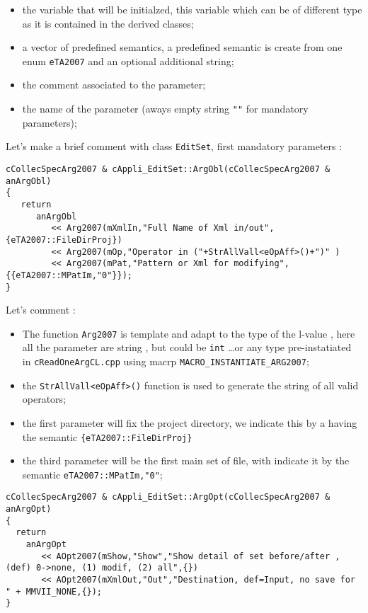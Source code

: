 \begin{itemize}
   \item  the variable that will be initialzed, this variable which can be of different type
          as it is contained in the derived classes;

   \item  a vector of predefined semantics, a predefined semantic is create from one
          enum {\tt eTA2007} and an optional additional string;
   \item  the comment associated to the parameter;
   \item  the name of the parameter (aways empty string {\tt ""} for mandatory parameters);
\end{itemize}

Let's make a brief comment with class {\tt EditSet}, first mandatory parameters :

{\small
\begin{verbatim}
cCollecSpecArg2007 & cAppli_EditSet::ArgObl(cCollecSpecArg2007 & anArgObl)
{
   return
      anArgObl
         << Arg2007(mXmlIn,"Full Name of Xml in/out",{eTA2007::FileDirProj})
         << Arg2007(mOp,"Operator in ("+StrAllVall<eOpAff>()+")" )
         << Arg2007(mPat,"Pattern or Xml for modifying",{{eTA2007::MPatIm,"0"}});
}
\end{verbatim}
}

Let's comment :

\begin{itemize}
   \item The function {\tt Arg2007} is template and adapt to the type of the
         l-value , here all the parameter are string , but could be {\tt int} \dots or
         any type pre-instatiated in {\tt cReadOneArgCL.cpp} using macrp {\tt MACRO\_INSTANTIATE\_ARG2007};

   \item the {\tt StrAllVall<eOpAff>()} function is used to generate the string of all valid operators;

   \item the first parameter will fix the project directory, we indicate this by a having
         the semantic {\tt  \{eTA2007::FileDirProj\}}

   \item the third parameter will be the first main set of file, with indicate it by
         the semantic {\tt {eTA2007::MPatIm,"0"}};
\end{itemize}

{\small
\begin{verbatim}
cCollecSpecArg2007 & cAppli_EditSet::ArgOpt(cCollecSpecArg2007 & anArgOpt)
{
  return
    anArgOpt
       << AOpt2007(mShow,"Show","Show detail of set before/after , (def) 0->none, (1) modif, (2) all",{})
       << AOpt2007(mXmlOut,"Out","Destination, def=Input, no save for " + MMVII_NONE,{});
}
\end{verbatim}
}

